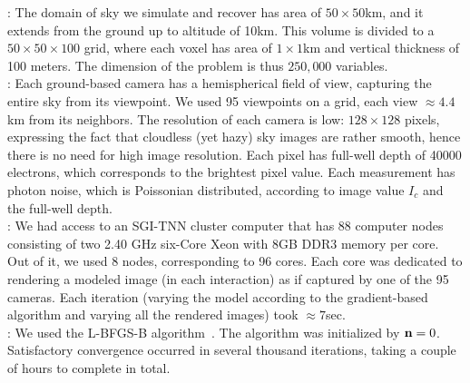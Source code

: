 \documentclass[10pt,twocolumn,letterpaper]{article}
\begin{document}
: The domain of sky we simulate and recover has area of $50\times 50$km, and it extends from the ground up to altitude of 10km. This volume is divided to a $50\times50\times100$ grid, where each voxel has area of $1\times1$km and vertical thickness of 100 meters. The dimension of the problem is thus $250,000$ variables.\\

: Each ground-based camera has a hemispherical field of view, capturing the entire sky from its viewpoint. We used 95 viewpoints on a grid, each view $\approx 4.4$km from its neighbors.
The resolution of each camera is low: $128\times 128$ pixels, expressing the fact that cloudless (yet hazy) sky images are rather smooth, hence there is no need for high image resolution. Each pixel has full-well depth of 40000 electrons, which corresponds to the brightest pixel value. Each measurement has photon noise, which is Poissonian distributed, according to image value $I_c$ and the full-well depth.\\

: We had access to an SGI-TNN cluster computer that has 88 computer nodes consisting of two 2.40 GHz six-Core Xeon with 8GB
DDR3 memory per core. Out of it, we used 8 nodes, corresponding to 96 cores. Each core was dedicated to rendering a modeled image (in each interaction) as if captured by one of the 95 cameras. Each iteration (varying the model according to the gradient-based algorithm and varying all the rendered images) took $\approx 7$sec.\\

: We used the L-BFGS-B algorithm~\cite{BFGS}. The algorithm was initialized by ${\bf n}=0$. Satisfactory convergence occurred in several thousand iterations, taking a couple of hours to complete in total.
\end{document}
